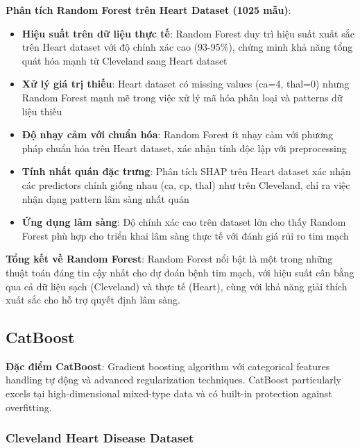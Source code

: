 \textbf{Phân tích Random Forest trên Heart Dataset (1025 mẫu)}:
\begin{itemize}[leftmargin=*]
    \item \textbf{Hiệu suất trên dữ liệu thực tế}: Random Forest duy trì hiệu suất xuất sắc trên Heart dataset với độ chính xác cao (93-95\%), chứng minh khả năng tổng quát hóa mạnh từ Cleveland sang Heart dataset
    \item \textbf{Xử lý giá trị thiếu}: Heart dataset có missing values (ca=4, thal=0) nhưng Random Forest mạnh mẽ trong việc xử lý mã hóa phân loại và patterns dữ liệu thiếu
    \item \textbf{Độ nhạy cảm với chuẩn hóa}: Random Forest ít nhạy cảm với phương pháp chuẩn hóa trên Heart dataset, xác nhận tính độc lập với preprocessing
    \item \textbf{Tính nhất quán đặc trưng}: Phân tích SHAP trên Heart dataset xác nhận các predictors chính giống nhau (ca, cp, thal) như trên Cleveland, chỉ ra việc nhận dạng pattern lâm sàng nhất quán
    \item \textbf{Ứng dụng lâm sàng}: Độ chính xác cao trên dataset lớn cho thấy Random Forest phù hợp cho triển khai lâm sàng thực tế với đánh giá rủi ro tim mạch
\end{itemize}

\textbf{Tổng kết về Random Forest}: Random Forest nổi bật là một trong những thuật toán đáng tin cậy nhất cho dự đoán bệnh tim mạch, với hiệu suất cân bằng qua cả dữ liệu sạch (Cleveland) và thực tế (Heart), cùng với khả năng giải thích xuất sắc cho hỗ trợ quyết định lâm sàng.

\FloatBarrier

\subsection{CatBoost}\label{subsec:catboost}

\textbf{Đặc điểm CatBoost}: Gradient boosting algorithm với categorical features handling tự động và advanced regularization techniques. CatBoost particularly excels tại high-dimensional mixed-type data và có built-in protection against overfitting.

\subsubsection{Cleveland Heart Disease Dataset}\label{subsubsec:catboost-cleveland}

